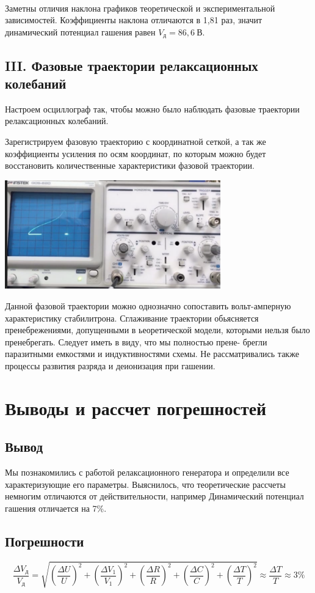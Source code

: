 \\

Заметны отличия наклона графиков теоретической и экспериментальной зависимостей. Коэффициенты наклона отличаются в 1,81 раз, значит динамический потенциал гашения равен $V_д = 86,6\ В. $\\

\subsection*{III. Фазовые траектории релаксационных колебаний}

Настроем осциллограф так, чтобы можно было наблюдать фазовые траектории релаксационных колебаний. 

Зарегистрируем фазовую траекторию с координатной сеткой, а так же коэффициенты усиления по осям координат, по которым можно будет восстановить количественные характеристики фазовой траектории. 

\begin{center}
\includegraphics[width=0.7\textwidth]{a.jpg} 
\end{center}

Данной фазовой траектории можно однозначно сопоставить вольт-амперную характеристику стабилитрона. Сглаживание траектории обьясняется пренебрежениями, допущенными в ьеоретической модели, которыми нельзя было пренебрегать. Следует иметь в виду, что мы полностью прене- брегли паразитными емкостями и индуктивностями схемы. Не рассматривались также процессы развития разряда и деионизация при гашении.

\section{Выводы и рассчет погрешностей}

\subsection{Вывод}


Мы познакомились с работой релаксационного генератора и определили все характеризующие его параметры.  Выяснилось, что теоретические рассчеты немногим отличаются от действительности, например Динамический потенциал гашения отличается на 7\%. 

\subsection{Погрешности}

$$\frac{\Delta V_{д}}{V_{д}} = \sqrt{\left(\frac{\Delta U}{U} \right)^2 + \left(\frac{\Delta V_1}{V_1} \right)^2 + \left(\frac{\Delta R}{R} \right)^2 + \left(\frac{\Delta C}{C} \right)^2 + \left(\frac{\Delta T}{T} \right)^2} \approx  \frac{\Delta T}{T}  \approx 3\%$$


